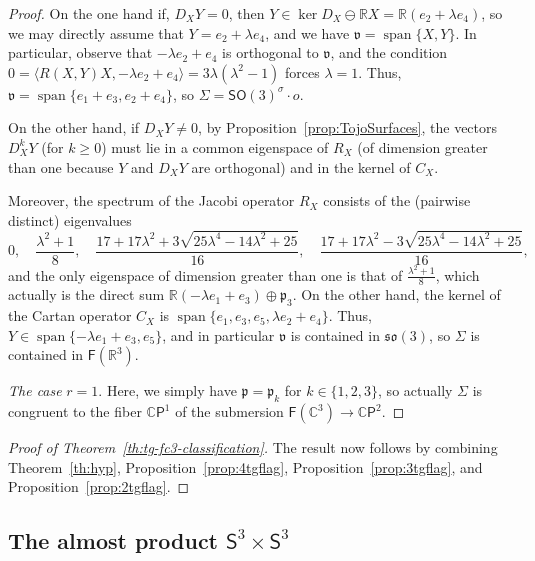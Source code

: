 \documentclass[11pt,a4paper,final]{amsart}
\newcommand{\g}{\mathfrak}
\newcommand{\R}{\mathbb{R}}
\newcommand{\C}{\mathbb{C}}
\newcommand{\vecspan}{\operatorname{span}}
\theoremstyle{definition}
\begin{document}
\begin{proof}
	On  the one hand if, $D_X Y=0$, then $Y\in \ker D_{X}\ominus \R X=\R(e_{2}+\lambda e_{4})$, so we may directly assume that $Y=e_{2}+\lambda e_{4}$, and we have $\g{v}=\vecspan\{X,Y\}$.
	In particular, observe that $-\lambda e_{2}+e_{4}$ is orthogonal to $\g{v}$, and the condition $0=\langle R(X,Y)X,-\lambda e_{2}+e_{4} \rangle=3\lambda(\lambda^{2}-1)$	forces $\lambda = 1$.
	Thus, $\g{v}=\vecspan\{e_{1}+e_{3},e_{2}+e_{4}\}$, so $\Sigma = \mathsf{SO}(3)^{\sigma}\cdot o$.
		
	On the other hand, if $D_X Y\neq 0$, by Proposition~\ref{prop:TojoSurfaces}, the vectors $D_X^k Y$ (for $k\geq 0$) must lie in a common eigenspace of $R_{X}$ (of dimension greater than one because $Y$ and $D_XY$ are orthogonal) and in the kernel of $C_{X}$.
		
	Moreover, the spectrum of the Jacobi operator $R_{X}$ consists of the (pairwise distinct) eigenvalues
	\begin{equation*}
		0, \quad \frac{\lambda^{2}+1}{8}, \quad \frac{17+17 \lambda ^2+3
			\sqrt{25 \lambda ^4-14 \lambda^2+25}}{16},\quad\frac{17+17 \lambda ^2-3
			\sqrt{25 \lambda ^4-14 \lambda
			^2+25}}{16},		
	\end{equation*}
	and the only eigenspace of dimension greater than one is that of $\frac{\lambda^{2}+1}{8}$, which actually is the direct sum $\R(-\lambda e_{1}+e_{3})\oplus \g{p}_{3}$.
	On the other hand, the kernel of the Cartan operator $C_{X}$ is $\vecspan\{e_{1},e_{3},e_{5},\lambda e_{2}+e_{4}\}$.
	Thus, $Y\in \vecspan\{-\lambda e_{1}+e_{3},e_{5}\}$, and in particular $\g{v}$ is contained in $\g{so}(3)$, so $\Sigma$ is contained in $\mathsf{F}(\R^{3})$.
		
	\textit{The case} $r=1$.
	Here, we simply have $\g{p}=\g{p}_{k}$ for $k\in \{1,2,3\}$, so actually $\Sigma$ is congruent to the fiber $\C\mathsf{P}^{1}$ of the submersion $\mathsf{F}(\C^{3})\to \C \mathsf{P}^{2}$. \qedhere
\end{proof}

\begin{proof}[Proof of Theorem~\ref{th:tg-fc3-classification}]
	The result now follows by combining Theorem~\ref{th:hyp}, Proposition~\ref{prop:4tgflag}, Proposition~\ref{prop:3tgflag}, and Proposition~\ref{prop:2tgflag}.
\end{proof}
	
\subsection{The almost product $\mathsf{S}^{3}\times\mathsf{S}^{3}$}\label{subsec:s3s3proof}
	
\end{document}
